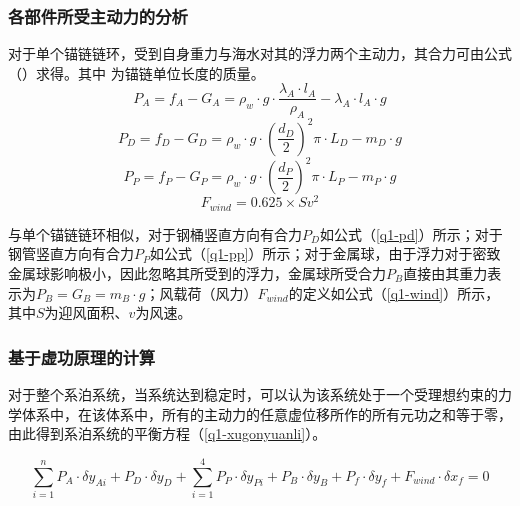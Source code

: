 \documentclass[withoutpreface,bwprint]{cumcmthesis} %
\begin{document}
\subsubsection*{各部件所受主动力的分析}
\par 对于单个锚链链环，受到自身重力与海水对其的浮力两个主动力，其合力可由公式（）求得。其中 为锚链单位长度的质量。
\begin{equation}
	\label{q1-pa}
	P_A = f_A - G_A  = \rho_w \cdot g \cdot \frac{\lambda_A \cdot l_A}{\rho_A} - \lambda_A \cdot l_A \cdot g
\end{equation}
\begin{equation}
	\label{q1-pd}
	P_D = f_D -G_D = \rho_w \cdot g \cdot (\frac{d_D}{2})^2 \pi \cdot L_D - m_D \cdot g
\end{equation}
\begin{equation}
	\label{q1-pp}
	P_P = f_P -G_P = \rho_w \cdot g \cdot (\frac{d_P}{2})^2 \pi \cdot L_P - m_P \cdot g
\end{equation}
\begin{equation}
	\label{q1-wind}
	F_{wind} = 0.625 \times S v^2
\end{equation}
\par 与单个锚链链环相似，对于钢桶竖直方向有合力$P_D$如公式（\ref{q1-pd}）所示；对于钢管竖直方向有合力$P_P$如公式（\ref{q1-pp}）所示；对于金属球，由于浮力对于密致金属球影响极小，因此忽略其所受到的浮力，金属球所受合力$P_B$直接由其重力表示为$P_B = G_B = m_B \cdot g$；风载荷（风力）$F_{wind}$的定义如公式（\ref{q1-wind}）所示，其中$S$为迎风面积、$v$为风速。
\subsubsection*{基于虚功原理的计算}

\par 对于整个系泊系统，当系统达到稳定时，可以认为该系统处于一个受理想约束的力学体系中，在该体系中，所有的主动力的任意虚位移所作的所有元功之和等于零，由此得到系泊系统的平衡方程（\ref{q1-xugonyuanli}）。

\begin{equation}
	\label{q1-xugonyuanli}
	\sum\limits_{i=1}^{n} P_A \cdot \delta y_{Ai} + P_D\cdot \delta y_D + \sum\limits_{i=1}^{4}P_P\cdot \delta y_{Pi} + P_B \cdot \delta y_{B} + P_f \cdot \delta y_{f} + F_{wind} \cdot \delta x_f = 0
\end{equation}
\end{document}
